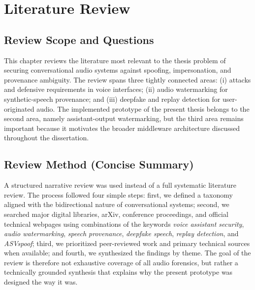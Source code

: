 
\chapter{Literature Review}\label{chap:litreview}

\section{Review Scope and Questions}
This chapter reviews the literature most relevant to the thesis problem of securing conversational audio systems against spoofing, impersonation, and provenance ambiguity. The review spans three tightly connected areas: (i) attacks and defensive requirements in voice interfaces; (ii) audio watermarking for synthetic-speech provenance; and (iii) deepfake and replay detection for user-originated audio. The implemented prototype of the present thesis belongs to the second area, namely assistant-output watermarking, but the third area remains important because it motivates the broader middleware architecture discussed throughout the dissertation.

\section{Review Method (Concise Summary)}
A structured narrative review was used instead of a full systematic literature review. The process followed four simple steps: first, we defined a taxonomy aligned with the bidirectional nature of conversational systems; second, we searched major digital libraries, arXiv, conference proceedings, and official technical webpages using combinations of the keywords \emph{voice assistant security}, \emph{audio watermarking}, \emph{speech provenance}, \emph{deepfake speech}, \emph{replay detection}, and \emph{ASVspoof}; third, we prioritized peer-reviewed work and primary technical sources when available; and fourth, we synthesized the findings by theme. The goal of the review is therefore not exhaustive coverage of all audio forensics, but rather a technically grounded synthesis that explains why the present prototype was designed the way it was.


